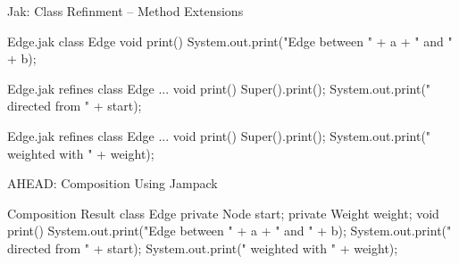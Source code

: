 \begin{frame}[fragile]{Jak: Class Refinment – Method Extensions}
	\begin{mycolumns}[widths={50,50},animation=none]
	\mynextcolumn
{\tiny
\begin{codetight}{Edge.jak}
class Edge {
	void print() {
		System.out.print("Edge between " + a + " and " + b);
	}
}
\end{codetight}
\begin{codetight}{Edge.jak}
refines class Edge {
	...
	void print() {
		Super().print();
		System.out.print(" directed from " + start);
	}
}
\end{codetight}
\begin{codetight}{Edge.jak}
refines class Edge {
	...
	void print() {
		Super().print();
		System.out.print(" weighted with " + weight);
	}
}
\end{codetight}
}
	\end{mycolumns}
\end{frame}

\begin{frame}[fragile]{AHEAD: Composition Using Jampack}
	\begin{mycolumns}[widths={50,50},animation=none]
	\mynextcolumn
\begin{codetight}{Composition Result}
class Edge {
	private Node start;
	private Weight weight;
	void print() {
		System.out.print("Edge between " + a + " and " + b);
		System.out.print(" directed from " + start);
		System.out.print(" weighted with " + weight);
	}
}
\end{codetight}
	\end{mycolumns}
\end{frame}

